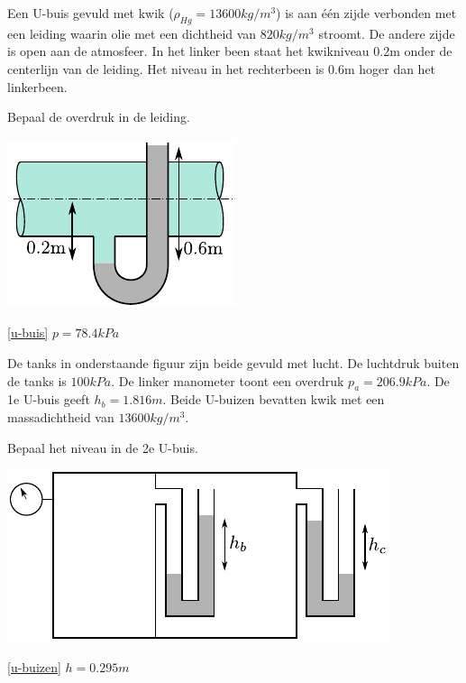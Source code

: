 \begin{toepassing}
	\label{u-buis}
Een U-buis gevuld met kwik ($\rho_{Hg}=13600\unit{kg/m^3}$) is aan één zijde verbonden met een leiding waarin olie met een dichtheid van $820\unit{kg/m^3}$ stroomt. De andere zijde is open aan de atmosfeer. In het linker been staat het kwikniveau 0.2m onder de centerlijn van de leiding. Het niveau in het rechterbeen is 0.6m hoger dan het linkerbeen.
		
Bepaal de overdruk in de leiding.

	\centering
	\includegraphics{fig/hydrostatica/u-buis}
\end{toepassing}
\begin{antwoord}{\ref{u-buis}}
	$p = 78.4\unit{kPa}$
\end{antwoord}
\begin{toepassing}
	\label{u-buizen}
De tanks in onderstaande figuur zijn beide gevuld met lucht. De luchtdruk buiten de tanks is $100\unit{kPa}$. De linker manometer toont een overdruk $p_a=206.9\unit{kPa}$. De 1e U-buis geeft $h_b=1.816\unit{m}$. Beide U-buizen bevatten kwik met een massadichtheid van $13600kg/m^3$.
		
Bepaal het niveau in de 2e U-buis.

	\centering
	\includegraphics{fig/hydrostatica/u-buizen}
\end{toepassing}
\begin{antwoord}{\ref{u-buizen}}
	$h = 0.295\unit{m}$
\end{antwoord}
